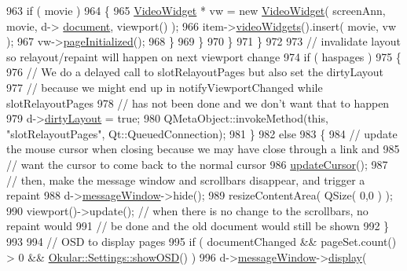 \begin{DoxyCode}
963                 \textcolor{keywordflow}{if} ( movie )
964                 \{
965                     \hyperlink{classVideoWidget}{VideoWidget} * vw = \textcolor{keyword}{new} \hyperlink{classVideoWidget}{VideoWidget}( screenAnn, movie, d->
      \hyperlink{classPageViewPrivate_a50645b9853306cffd74e51efb677e5b4}{document}, viewport() );
966                     item->\hyperlink{classPageViewItem_a125302408597cab2a58ef2ad309e2912}{videoWidgets}().insert( movie, vw );
967                     vw->\hyperlink{classVideoWidget_a90dbdcbaffc7717c7e3b327ad076bc58}{pageInitialized}();
968                 \}
969             \}
970         \}
971     \}
972 
973     \textcolor{comment}{// invalidate layout so relayout/repaint will happen on next viewport change}
974     \textcolor{keywordflow}{if} ( haspages )
975     \{
976         \textcolor{comment}{// We do a delayed call to slotRelayoutPages but also set the dirtyLayout}
977         \textcolor{comment}{// because we might end up in notifyViewportChanged while slotRelayoutPages}
978         \textcolor{comment}{// has not been done and we don't want that to happen}
979         d->\hyperlink{classPageViewPrivate_a2acaf067a43d2fae544738ceac1f7ed6}{dirtyLayout} = \textcolor{keyword}{true};
980         QMetaObject::invokeMethod(\textcolor{keyword}{this}, \textcolor{stringliteral}{"slotRelayoutPages"}, Qt::QueuedConnection);
981     \}
982     \textcolor{keywordflow}{else}
983     \{
984         \textcolor{comment}{// update the mouse cursor when closing because we may have close through a link and}
985         \textcolor{comment}{// want the cursor to come back to the normal cursor}
986         \hyperlink{classPageView_a0054ba6d2967fa31dea42dcc9d9020b6}{updateCursor}();
987         \textcolor{comment}{// then, make the message window and scrollbars disappear, and trigger a repaint}
988         d->\hyperlink{classPageViewPrivate_aa836af37149ea9fbfefd8de357c9194b}{messageWindow}->hide();
989         resizeContentArea( QSize( 0,0 ) );
990         viewport()->update(); \textcolor{comment}{// when there is no change to the scrollbars, no repaint would}
991                               \textcolor{comment}{// be done and the old document would still be shown}
992     \}
993 
994     \textcolor{comment}{// OSD to display pages}
995     \textcolor{keywordflow}{if} ( documentChanged && pageSet.count() > 0 && \hyperlink{classOkular_1_1Settings_ab6a3d4459b9ef5fa47cc7083968da797}{Okular::Settings::showOSD}() )
996         d->\hyperlink{classPageViewPrivate_aa836af37149ea9fbfefd8de357c9194b}{messageWindow}->\hyperlink{classPageViewMessage_a7fd107b1b7a6c0ae64a4d09fc2467982}{display}(

\end{DoxyCode}
